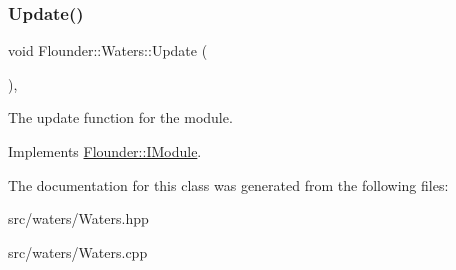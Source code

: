 \subsubsection{\texorpdfstring{Update()}{Update()}}
{\footnotesize\ttfamily void Flounder\+::\+Waters\+::\+Update (\begin{DoxyParamCaption}{ }\end{DoxyParamCaption})\hspace{0.3cm}{\ttfamily [override]}, {\ttfamily [virtual]}}



The update function for the module. 



Implements \hyperlink{class_flounder_1_1_i_module_a1812bb03a6990e4698a10c043fa25fde}{Flounder\+::\+I\+Module}.



The documentation for this class was generated from the following files\+:\begin{DoxyCompactItemize}
\item 
src/waters/Waters.\+hpp\item 
src/waters/Waters.\+cpp\end{DoxyCompactItemize}
